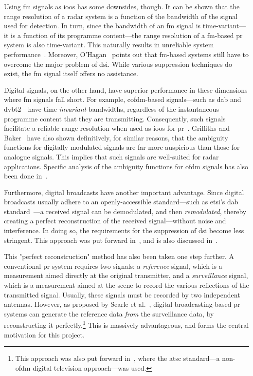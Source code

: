 \documentclass[class=report,11pt,crop=false]{standalone}
\begin{document}
Using \gls{fm} signals as \gls{ioo}s has some downsides, though. It can be shown that the range resolution of a radar system is a function of the bandwidth of the signal used for detection. In turn, since the bandwidth of an \gls{fm} signal is time-variant---it is a function of its programme content---the range resolution of a \gls{fm}-based \gls{pr} system is also time-variant. This naturally results in unreliable system performance~\cite{ohagan2010dab}. Moreover, O'Hagan~\cite{OHagan2007} points out that \gls{fm}-based systems still have to overcome the major problem of \gls{dsi}. While various suppression techniques do exist, the \gls{fm} signal itself offers no assistance.

Digital signals, on the other hand, have superior performance in these dimensions where \gls{fm} signals fall short. For example, \gls{cofdm}-based signals---such as \gls{dab} and \gls{dvbt2}---have time-\emph{invariant} bandwidths, regardless of the instantaneous programme content that they are transmitting. Consequently, such signals facilitate a reliable range-resolution when used as \gls{ioo}s for \gls{pr}~\cite{ohagan2010dab}. Griffiths and Baker~\cite{Griffithsa} have also shown definitively, for similar reasons, that the ambiguity functions for digitally-modulated signals are far more auspicious than those for analogue signals. This implies that such signals are well-suited for radar applications. Specific analysis of the ambiguity functions for \gls{ofdm} signals has also been done in~\cite{Searle2014}.

Furthermore, digital broadcasts have another important advantage. Since digital broadcasts usually adhere to an openly-accessible standard---such as \gls{etsi}'s \gls{dab} standard~\cite{dabstandard}---a received signal can be demodulated, and then \emph{remodulated}, thereby creating a perfect reconstruction of the received signal---without noise and interference. In doing so, the requirements for the suppression of \gls{dsi} become less stringent. This approach was put forward in~\cite{ohagan2010dab}, and is also discussed in~\cite{Berger2010}.

This "perfect reconstruction" method has also been taken one step further. A conventional \gls{pr} system requires two signals: a \emph{reference} signal, which is a measurement aimed directly at the original transmitter, and a \emph{surveillance} signal, which is a measurement aimed at the scene to record the various reflections of the transmitted signal. Usually, these signals must be recorded by two independent antennas. However, as proposed by Searle et al.~\cite{Searle2015}, digital broadcasting-based \gls{pr} systems can generate the reference data \emph{from} the surveillance data, by reconstructing it perfectly.\footnote{This approach was also put forward in~\cite{Barott2014}, where the \gls{atsc} standard---a non-\gls{ofdm} digital television approach---was used.} This is massively advantageous, and forms the central motivation for this project.
\end{document}
